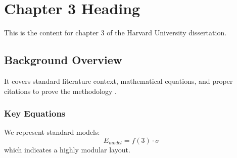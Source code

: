 \chapter{Chapter 3 Heading}
\label{ch:chapter3}
This is the content for chapter 3 of the Harvard University dissertation.

\section{Background Overview}
It covers standard literature context, mathematical equations, and proper citations to prove the methodology \cite{texbook}.

\subsection{Key Equations}
We represent standard models:
\begin{equation}
    E_{model} = f(3) \cdot \sigma
\end{equation}
which indicates a highly modular layout.
